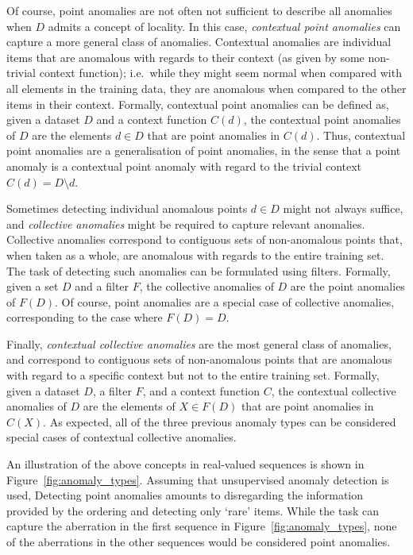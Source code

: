 Of course, point anomalies are not often not sufficient to describe all anomalies when $D$ admits a concept of locality. In this case, \emph{contextual point anomalies} can capture a more general class of anomalies. Contextual anomalies are individual items that are anomalous with regards to their context (as given by some non-trivial context function); i.e.\ while they might seem normal when compared with all elements in the training data, they are anomalous when compared to the other items in their context. Formally, contextual point anomalies can be defined as, given a dataset $D$ and a context function $C(d)$, the contextual point anomalies of $D$ are the elements $d \in D$ that are point anomalies in $C(d)$. Thus, contextual point anomalies are a generalisation of point anomalies, in the sense that a point anomaly is a contextual point anomaly with regard to the trivial context $C(d) = D \setminus {d}$.

Sometimes detecting individual anomalous points $d \in D$ might not always suffice, and \emph{collective anomalies} might be required to capture relevant anomalies. Collective anomalies correspond to contiguous sets of non-anomalous points that, when taken as a whole, are anomalous with regards to the entire training set. The task of detecting such anomalies can be formulated using filters. Formally, given a set $D$ and a filter $F$, the collective anomalies of $D$ are the point anomalies of $F(D)$. Of course, point anomalies are a special case of collective anomalies, corresponding to the case where $F(D) = D$.

Finally, \emph{contextual collective anomalies} are the most general class of anomalies, and correspond to contiguous sets of non-anomalous points that are anomalous with regard to a specific context but not to the entire training set. Formally, given a dataset $D$, a filter $F$, and a context function $C$, the contextual collective anomalies of $D$ are the elements of $X \in F(D)$ that are point anomalies in $C(X)$. As expected, all of the three previous anomaly types can be considered special cases of contextual collective anomalies.

An illustration of the above concepts in real-valued sequences is shown in Figure~\ref{fig:anomaly_types}. Assuming that unsupervised anomaly detection is used, Detecting point anomalies amounts to disregarding the information provided by the ordering and detecting only `rare' items. While the task can capture the aberration in the first sequence in Figure~\ref{fig:anomaly_types}, none of the aberrations in the other sequences would be considered point anomalies.

